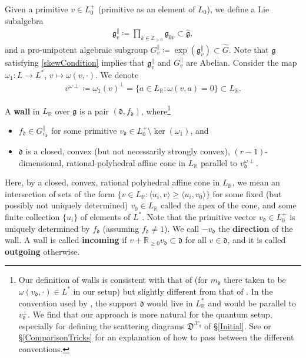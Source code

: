 \documentclass{amsart}
\let\bb=\mathbb
\let\rar=\rightarrow
\let\f=\mathfrak
\let\s=\mathcal
\theoremstyle{plain}%
\theoremstyle{definition}
\theoremstyle{remark}
\begin{document}
Given a primitive $v\in L_0^+$ (primitive as an element of $L_0$), we define a Lie subalgebra
\begin{align*}
    \f{g}_v^{\parallel}\coloneqq \prod_{k\in \bb{Z}_{>0}} \f{g}_{kv}\subset \hat{\f{g}},
\end{align*}
and a pro-unipotent algebraic subgroup $G_v^{\parallel}\coloneqq \exp(\f{g}_v^{\parallel})\subset \hat{G}$.  Note that $\f{g}$ satisfying \eqref{skewCondition} implies that $\f{g}_v^{\parallel}$ and $G_v^{\parallel}$ are Abelian.  Consider the map $\omega_1\colon L\rar L^*$, $v\mapsto \omega(v,\cdot)$.  We denote 
\begin{align*}
    v^{\omega\perp}\coloneqq \omega_1(v)^{\perp}=\{a\in L_{\bb{R}}\colon \omega(v,a)=0\} \subset L_{\bb{R}}.
\end{align*}


A \textbf{wall} in $L_{\bb{R}}$ over $\f{g}$ is a pair $(\f{d},f_{\f{d}})$, where\footnote{Our definition of walls is consistent with that of \cite[Def. 2.2]{Man3} (for $m_{\f{d}}$ there taken to be $\omega(v_{\f{d}},\cdot)\in L^*$ in our setup) but slightly different from that of \cite[Def. 1.4]{GHKK}.  In the convention used by \cite{GHKK}, the support $\f{d}$ would live in $L^*_{\bb{R}}$ and would be parallel to $v_{\f{d}}^{\perp}$.  We find that our approach is more natural for the quantum setup, especially for defining the scattering diagrams $\f{D}^{\s{X}_q}$ of \S \ref{Initial}.   See \cite[Rmk. 2.3]{Man3} or \S \ref{ComparisonTricks} for an explanation of how to pass between the different conventions.\label{ConventionsFootnote}}
\begin{itemize}
    \item $f_{\f{d}}\in G_{v_{\f{d}}}^{\parallel}$ for some primitive $v_{\f{d}}\in L_0^+\setminus \ker(\omega_1)$, and
    \item $\f{d}$ is a closed, convex (but not necessarily strongly convex), $(r-1)$-dimensional, rational-polyhedral affine cone in $L_{\bb{R}}$ parallel to $v_{\f{d}}^{\omega\perp}$.
\end{itemize} 
Here, by a closed, convex, rational polyhedral affine cone in $L_{\bb{R}}$, we mean an intersection of sets of the form $\{v\in L_{\bb{R}}\colon \langle u_i,v\rangle \geq \langle u_i,v_0\rangle\}$ for some fixed (but possibly not uniquely determined) $v_0\in L_{\bb{R}}$ called the apex of the cone, and some finite collection $\{u_i\}$ of elements of $L^*$.  Note that the primitive vector $v_{\f{d}}\in L_0^+$ is uniquely determined by $f_{\f{d}}$ (assuming $f_{\f{d}}\neq 1$).  We call $-v_{\f{d}}$ the \textbf{direction} of the wall.  A wall is called \textbf{incoming} if $v+\bb{R}_{\geq 0}v_{\f{d}}\subset \f{d}$ for all $v\in \f{d}$, and it is called \textbf{outgoing} otherwise.
\end{document}
